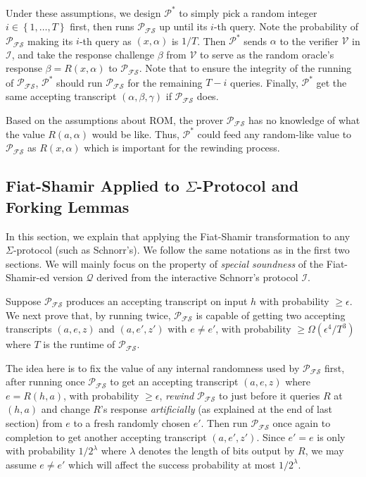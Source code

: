 \documentclass{article}
\begin{document}
Under these assumptions, we design $\mathcal{P}^{\displaystyle *}$ to simply pick a random integer $i \in \left\{ 1, \dots, T \right\}$ first, then runs $\mathcal{P_{FS}}$ up until its $i$-th query. Note the probability of $\mathcal{P_{FS}}$ making its $i$-th query as $(x, \alpha)$ is $1/T$. Then $\mathcal{P}^{\displaystyle *}$ sends $\alpha$ to the verifier $\mathcal{V}$ in $\mathcal{I}$, and take the response challenge $\beta$ from $\mathcal{V}$ to serve as the random oracle's response $\beta = R(x, \alpha)$ to $\mathcal{P_{FS}}$. Note that to ensure the integrity of the running of $\mathcal{P_{FS}}$, $\mathcal{P}^{\displaystyle *}$ should run $\mathcal{P_{FS}}$ for the remaining $T-i$ queries. Finally, $\mathcal{P}^{\displaystyle *}$ get the same accepting transcript $(\alpha, \beta, \gamma)$ if $\mathcal{P_{FS}}$ does. 

\begin{remark}
Based on the assumptions about ROM, the prover $\mathcal{P_{FS}}$ has no knowledge of what the value $R(a, \alpha)$ would be like. Thus, $\mathcal{P}^{\displaystyle *}$ could feed any random-like value to $\mathcal{P_{FS}}$ as $R(x, \alpha)$ which is important for the rewinding process. 
\end{remark}

\subsection{Fiat-Shamir Applied to $\Sigma$-Protocol and Forking Lemmas}\label{sec:fiat-shamir-forking-lemmas}

In this section, we explain that applying the Fiat-Shamir transformation to any $\Sigma$-protocol (such as Schnorr's). We follow the same notations as in the first two sections. We will mainly focus on the property of \textit{special soundness} of the Fiat-Shamir-ed version $\mathcal{Q}$ derived from the interactive Schnorr's protocol $\mathcal{I}$. 

Suppose $\mathcal{P_{FS}}$ produces an accepting transcript on input $h$ with probability $\geq \epsilon$. We next prove that, by running twice, $\mathcal{P_{FS}}$ is capable of getting two accepting transcripts $(a, e, z)$ and $(a, e', z')$ with $e \neq e'$, with probability $\geq \Omega(\epsilon^4 / T^3)$ where $T$ is the runtime of $\mathcal{P_{FS}}$.

The idea here is to fix the value of any internal randomness used by $\mathcal{P_{FS}}$ first, after running once $\mathcal{P_{FS}}$ to get an accepting transcript $(a, e, z)$ where $e = R(h, a)$, with probability $\geq \epsilon$, \textit{rewind} $\mathcal{P_{FS}}$ to just before it queries $R$ at $(h, a)$ and change $R$'s response \textit{artificially} (as explained at the end of last section) from $e$ to a fresh randomly chosen $e'$. Then run $\mathcal{P_{FS}}$ once again to completion to get another accepting transcript $(a, e', z')$. Since $e' = e$ is only with probability $1/2^{\lambda}$ where $\lambda$ denotes the length of bits output by $R$, we may assume $e \neq e'$ which will affect the success probability at most $1/2^{\lambda}$. 
\end{document}
